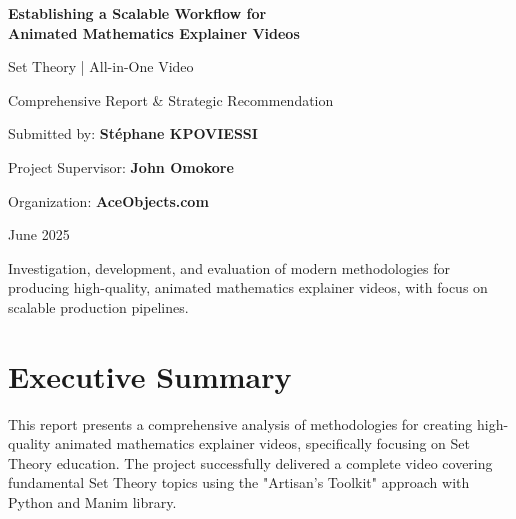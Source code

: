 \documentclass[12pt,a4paper]{article}
\begin{document}
\begin{titlepage}
    \centering
    \vspace*{2cm}
    
    {\Huge\bfseries Establishing a Scalable Workflow for\\Animated Mathematics Explainer Videos}
    
    \vspace{1.5cm}
    
    {\LARGE Set Theory | All-in-One Video}
    
    \vspace{1cm}
    
    {\Large Comprehensive Report \& Strategic Recommendation}
    
    \vspace{2cm}
    
    {\large Submitted by: \textbf{Stéphane KPOVIESSI}}
    
    \vspace{0.5cm}
    
    {\large Project Supervisor: \textbf{John Omokore}}
    
    \vspace{0.5cm}
    
    {\large Organization: \textbf{AceObjects.com}}
    
    \vspace{2cm}
    
    {\large June 2025}
    
    \vfill
    
    \begin{tcolorbox}[colback=blue!5!white,colframe=blue!75!black,title=Project Mission]
    Investigation, development, and evaluation of modern methodologies for producing high-quality, animated mathematics explainer videos, with focus on scalable production pipelines.
    \end{tcolorbox}
    
\end{titlepage}

\newpage
\tableofcontents
\newpage

\section{Executive Summary}

This report presents a comprehensive analysis of methodologies for creating high-quality animated mathematics explainer videos, specifically focusing on Set Theory education. The project successfully delivered a complete video covering fundamental Set Theory topics using the "Artisan's Toolkit" approach with Python and Manim library.
\end{document}
